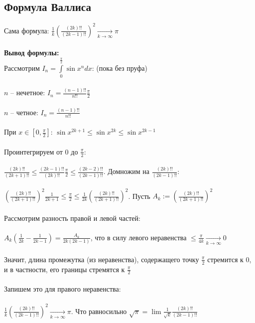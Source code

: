 \documentclass[../main.tex]{subfiles}
\begin{document}
\subsection{Формула Валлиса}
Сама формула: $\frac{1}{k}{(\frac{(2k)!!}{(2k-1)!!})}^{2} \underset{k \to \infty}{\longrightarrow} \pi$ \\\\
\textbf{Вывод формулы:} \\
Рассмотрим $I_n = \int\limits_{0}^{\frac{\pi}{2}}\sin{x}^{n}dx$: (пока без пруфа)\\\\
$n$ -- нечетное: $I_n = \frac{(n - 1)!!}{n!!} \frac{\pi}{2}$ \\\\
$n$ -- четное: $I_n = \frac{(n - 1)!!}{n!!}$ \\\\
При $x \in [0, \frac{\pi}{2}]$: $\sin{x}^{2k+1} \leq \sin{x}^{2k} \leq \sin{x}^{2k-1}$ \\\\
Проинтегрируем от 0 до $\frac{\pi}{2}$: \\\\
$\frac{(2k)!!}{(2k+1)!!} \leq \frac{(2k-1)!!}{(2k)!!} \frac{\pi}{2} \leq \frac{(2k-2)!!}{(2k-1)!!}$. Домножим на $\frac{(2k)!!}{(2k-1)!!}$: \\\\
${(\frac{(2k)!!}{(2k+1)!!})}^{2} \frac{1}{2k+1} \leq \frac{\pi}{2} \leq \frac{1}{2k} {(\frac{(2k)!!}{(2k+1)!!})}^{2}$. Пусть $A_k := {(\frac{(2k)!!}{(2k+1)!!})}^{2}$ \\\\
Рассмотрим разность правой и левой частей: \\\\
$A_k(\frac{1}{2k} - \frac{1}{2k-1}) = \frac{A_k}{2k(2k-1)}$, что в силу левого неравенства $\leq \frac{\pi}{4k} \underset{k \to \infty}{\longrightarrow} 0$ \\\\
Значит, длина промежутка (из неравенства), содержащего точку $\frac{\pi}{2}$ стремится к 0, и в частности, его границы стремятся к $\frac{\pi}{2}$\\\\
Запишем это для правого неравенства:\\\\
$\frac{1}{k}{(\frac{(2k)!!}{(2k-1)!!})}^{2} \underset{k \to \infty}{\longrightarrow} \pi$. Что равносильно $\sqrt{\pi} = \lim{\frac{1}{\sqrt{k}} \frac{(2k)!!}{(2k-1)!!}}$
\end{document}
